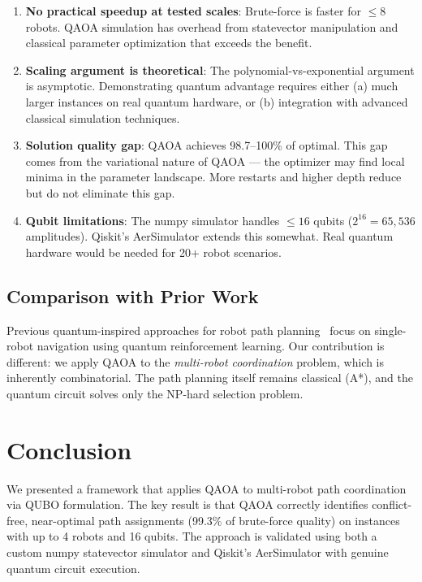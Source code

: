 \documentclass[conference]{IEEEtran}
\begin{document}
\begin{enumerate}
    \item \textbf{No practical speedup at tested scales}: Brute-force is faster for $\leq 8$ robots. QAOA simulation has overhead from statevector manipulation and classical parameter optimization that exceeds the benefit.

    \item \textbf{Scaling argument is theoretical}: The polynomial-vs-exponential argument is asymptotic. Demonstrating quantum advantage requires either (a) much larger instances on real quantum hardware, or (b) integration with advanced classical simulation techniques.

    \item \textbf{Solution quality gap}: QAOA achieves 98.7--100\% of optimal. This gap comes from the variational nature of QAOA --- the optimizer may find local minima in the parameter landscape. More restarts and higher depth reduce but do not eliminate this gap.

    \item \textbf{Qubit limitations}: The numpy simulator handles $\leq 16$ qubits ($2^{16} = 65{,}536$ amplitudes). Qiskit's AerSimulator extends this somewhat. Real quantum hardware would be needed for 20+ robot scenarios.
\end{enumerate}

\subsection{Comparison with Prior Work}

Previous quantum-inspired approaches for robot path planning~\cite{dong2008quantum, hybridpaper2023, qer2020} focus on single-robot navigation using quantum reinforcement learning. Our contribution is different: we apply QAOA to the \textit{multi-robot coordination} problem, which is inherently combinatorial. The path planning itself remains classical (A*), and the quantum circuit solves only the NP-hard selection problem.

\section{Conclusion}
\label{sec:conclusion}

We presented a framework that applies QAOA to multi-robot path coordination via QUBO formulation. The key result is that QAOA correctly identifies conflict-free, near-optimal path assignments (99.3\% of brute-force quality) on instances with up to 4 robots and 16 qubits. The approach is validated using both a custom numpy statevector simulator and Qiskit's AerSimulator with genuine quantum circuit execution.
\end{document}
